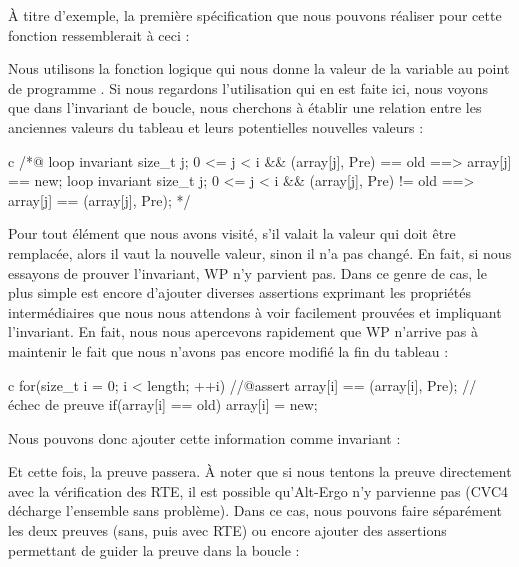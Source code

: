 À titre d'exemple, la première spécification que nous pouvons réaliser pour 
cette fonction ressemblerait à ceci :






Nous utilisons la fonction logique  qui nous donne la valeur de
la variable  au point de programme . Si nous regardons l'utilisation qui
en est faite ici, nous voyons que dans l'invariant de boucle, nous cherchons à 
établir une relation entre les anciennes valeurs du tableau et leurs potentielles 
nouvelles valeurs :



\begin{CodeBlock}{c}
/*@
  loop invariant \forall size_t j; 0 <= j < i && \at(array[j], Pre) == old 
                   ==> array[j] == new;
  loop invariant \forall size_t j; 0 <= j < i && \at(array[j], Pre) != old 
                   ==> array[j] == \at(array[j], Pre);
*/
\end{CodeBlock}



Pour tout élément que nous avons visité, s'il valait la valeur qui doit être
remplacée, alors il vaut la nouvelle valeur, sinon il n'a pas changé. En fait, si nous essayons de prouver l'invariant, WP n'y parvient pas. Dans ce genre de 
cas, le plus simple est encore d'ajouter diverses assertions exprimant les 
propriétés intermédiaires que nous nous attendons à voir facilement prouvées 
et impliquant l'invariant. En fait, nous nous apercevons rapidement que WP 
n'arrive pas à maintenir le fait que nous n'avons pas encore modifié la fin du 
tableau :



\begin{CodeBlock}{c}
for(size_t i = 0; i < length; ++i){
    //@assert array[i] == \at(array[i], Pre); // échec de preuve
    if(array[i] == old) array[i] = new;
}
\end{CodeBlock}



Nous pouvons donc ajouter cette information comme invariant :






Et cette fois, la preuve passera. À noter que si nous tentons la preuve 
directement avec la vérification des RTE, il est possible qu'Alt-Ergo n'y
parvienne pas (CVC4 décharge l'ensemble sans problème). Dans ce cas, nous
pouvons faire séparément les deux preuves (sans, puis avec RTE) ou encore 
ajouter des assertions permettant de guider la preuve dans la boucle :



